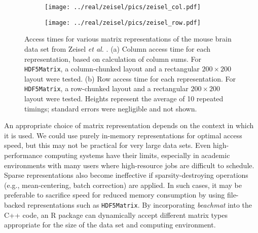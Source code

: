 \documentclass[10pt,letterpaper]{article}
\newcommand{\beachmat}{\textit{beachmat}}
\newcommand{\code}[1]{\texttt{#1}}
\begin{document}
\begin{figure}[bt]
    \begin{subfigure}[b]{0.49\textwidth}
        \texttt{[image: ../real/zeisel/pics/zeisel\_col.pdf]}
        \caption{}
    \end{subfigure}
    \begin{subfigure}[b]{0.49\textwidth}
        \texttt{[image: ../real/zeisel/pics/zeisel\_row.pdf]}
        \caption{}
    \end{subfigure}
    \caption{Access times for various matrix representations of the mouse brain data set from Zeisel \textit{et al.} \cite{zeisel2015brain}.
        (a) Column access time for each representation, based on calculation of column sums.
        For \code{HDF5Matrix}, a column-chunked layout and a rectangular $200 \times 200$ layout were tested.
        (b) Row access time for each representation.
        For \code{HDF5Matrix}, a row-chunked layout and a rectangular $200 \times 200$ layout were tested.
        Heights represent the average of 10 repeated timings; standard errors were negligible and not shown.
    }
    \label{fig:zeisel}
\end{figure}

An appropriate choice of matrix representation depends on the context in which it is used.
We could use purely in-memory representations for optimal access speed, but this may not be practical for very large data sets.
Even high-performance computing systems have their limits, especially in academic environments with many users where high-resource jobs are difficult to schedule.
Sparse representations also become ineffective if sparsity-destroying operations (e.g., mean-centering, batch correction) are applied.
In such cases, it may be preferable to sacrifice speed for reduced memory consumption by using file-backed representations such as \code{HDF5Matrix}.
By incorporating \beachmat{} into the C++ code, an R package can dynamically accept different matrix types appropriate for the size of the data set and computing environment.
\end{document}

